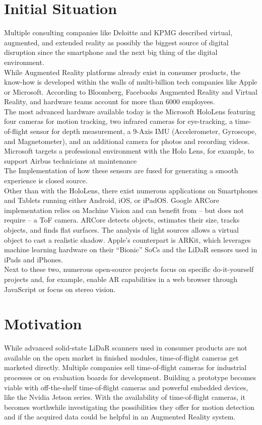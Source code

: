\section{Initial Situation}
\label{sec:Situation}
Multiple consulting companies like Deloitte and KPMG described virtual, augmented, and extended reality as possibly the biggest source of digital disruption since the smartphone\cite{KPMG_on_AR} and the next big thing of the digital environment\cite{Deloitte_on_AR}.\\
While Augmented Reality platforms already exist in consumer products, the know-how is developed within the walls of multi-billion tech companies like Apple or Microsoft. According to Bloomberg, Facebooks Augmented Reality and Virtual Reality, and hardware teams account for more than 6000 employees\cite{Bloomberg_on_AR}. \\
The most advanced hardware available today is the Microsoft HoloLens\cite{Hololens} featuring four cameras for motion tracking, two infrared cameras for eye-tracking, a time-of-flight sensor for depth measurement, a 9-Axis IMU (Accelerometer, Gyroscope, and Magnetometer), and an additional camera for photos and recording videos. Microsoft targets a professional environment with the Holo Lens, for example, to support Airbus technicians at maintenance\cite{AirbusHololens} \\
The Implementation of how these sensors are fused for generating a smooth experience is closed source.\\
Other than with the HoloLens, there exist numerous applications on Smartphones and Tablets running either Android, iOS, or iPadOS. Google ARCore implementation relies on Machine Vision and can benefit from – but does not require –  a ToF camera. ARCore detects objects, estimates their size, tracks objects, and finds flat surfaces. The analysis of light sources allows a virtual object to cast a realistic shadow. Apple’s counterpart is ARKit, which leverages machine learning hardware on their “Bionic” SoCs and the LiDaR sensors used in iPads and iPhones.\cite{AppleLidar}\\
Next to these two, numerous open-source projects focus on specific do-it-yourself projects and, for example, enable AR capabilities in a web browser through JavaScript\cite{ar_js}\cite{argon_js} or focus on stereo vision. 
\section{Motivation}
\label{sec:Motivation}
While advanced solid-state LiDaR scanners used in consumer products are not available on the open market in finished modules, time-of-flight cameras get marketed directly. Multiple companies sell time-of-flight cameras for industrial processes or on evaluation boards for development. Building a prototype becomes viable with off-the-shelf time-of-flight cameras and powerful embedded devices, like the Nvidia Jetson series. 
With the availability of time-of-flight cameras, it becomes worthwhile investigating the possibilities they offer for motion detection and if the acquired data could be helpful in an Augmented Reality system. 

